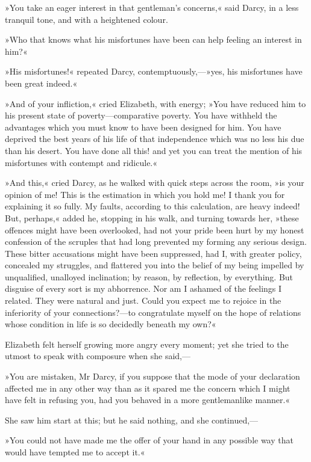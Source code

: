 »You take an eager interest in that gentleman's concerns,« said Darcy, in a less tranquil tone, and with a heightened colour.

»Who that knows what his misfortunes have been can help feeling an interest in him?«

»His misfortunes!« repeated Darcy, contemptuously,—»yes, his misfortunes have been great indeed.«

»And of your infliction,« cried Elizabeth, with energy; »You have reduced him to his present state of poverty—comparative poverty. You have withheld the advantages which you must know to have been designed for him. You have deprived the best years of his life of that independence which was no less his due than his desert. You have done all this! and yet you can treat the mention of his misfortunes with contempt and ridicule.«

»And this,« cried Darcy, as he walked with quick steps across the room, »is your opinion of me! This is the estimation in which you hold me! I thank you for explaining it so fully. My faults, according to this calculation, are heavy indeed! But, perhaps,« added he, stopping in his walk, and turning towards her, »these offences might have been overlooked, had not your pride been hurt by my honest confession of the scruples that had long prevented my forming any serious design. These bitter accusations might have been suppressed, had I, with greater policy, concealed my struggles, and flattered you into the belief of my being impelled by unqualified, unalloyed inclination; by reason, by reflection, by everything. But disguise of every sort is my abhorrence. Nor am I ashamed of the feelings I related. They were natural and just. Could you expect me to rejoice in the inferiority of your connections?—to congratulate myself on the hope of relations whose condition in life is so decidedly beneath my own?«

Elizabeth felt herself growing more angry every moment; yet she tried to the utmost to speak with composure when she said,—

»You are mistaken, Mr Darcy, if you suppose that the mode of your declaration affected me in any other way than as it spared me the concern which I might have felt in refusing you, had you behaved in a more gentlemanlike manner.«

She saw him start at this; but he said nothing, and she continued,—

»You could not have made me the offer of your hand in any possible way that would have tempted me to accept it.«


